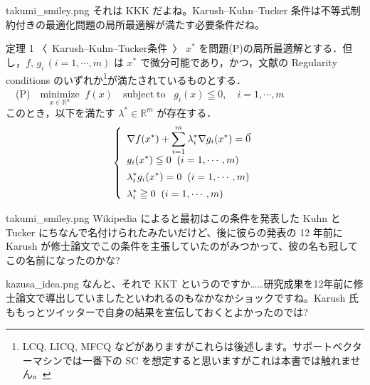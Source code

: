 \documentclass[b5paper,xelatex,ja=standard,10pt]{bxjsarticle}
\begin{document}
\begin{SERIFU}[colback=PaleGold, colbacktitle=PaleGold2]{takumi_smiley.png}
それは KKK だよね。Karush–Kuhn–Tucker 条件は不等式制約付きの最適化問題の局所最適解が満たす必要条件だね。
\end{SERIFU}

\begin{PROP}[colback=White]{定理 1 〈\, Karush–Kuhn–Tucker条件 \,〉}
$x^\ast$ を問題(P)の局所最適解とする．但し，$f, \, g_i \, (i = 1, \cdots, m)$ は $x^\ast$ で微分可能であり，かつ，文献\cite{wikipedia_en}の Regularity conditions のいずれか\footnote{LCQ, LICQ, MFCQ などがありますがこれらは後述します。サポートベクターマシンでは一番下の SC を想定すると思いますがこれは本書では触れません。}が満たされているものとする．
\\[5pt]
　(P)　$\displaystyle \underset{x \in \mathbb{R}^n}{\mathrm{minimize}} \; \; f(x)  \quad  \mathrm{subject \; to}   \; \; \; g_i(x) \leqq 0,  \quad i = 1, \cdots, m $
\\[5pt]
このとき，以下を満たす $\lambda^\ast \in \mathbb{R}^m$ が存在する．
\begin{eqnarray*}
\left\{
\begin{array}{l}
\displaystyle \nabla f (x^\ast) + \sum_{i=1}^m \lambda^\ast_i \nabla g_i (x^\ast) = \vec{0} \\[5pt]
\displaystyle g_i(x^\ast) \leqq 0 \; \; (i = 1, \cdots, m) \\[5pt]
\displaystyle \lambda^\ast_i g_i (x^\ast) = 0 \; \; (i = 1, \cdots, m) \\[5pt]
\displaystyle \lambda^\ast_i \geqq 0 \; \; (i = 1, \cdots, m) \notag
\end{array}
\right.
\end{eqnarray*}
\end{PROP}

\begin{SERIFU}[colback=PaleGold, colbacktitle=PaleGold2]{takumi_smiley.png}
Wikipedia \cite{wikipedia_en} によると最初はこの条件を発表した Kuhn と Tucker にちなんで名付けられたみたいだけど、後に彼らの発表の 12 年前に Karush が修士論文でこの条件を主張していたのがみつかって、彼の名も冠してこの名前になったのかな?
\end{SERIFU}

\begin{SERIFU}[colback=PaleIris, colbacktitle=PaleIris2]{kazusa_idea.png}
なんと、それで KKT というのですか……研究成果を12年前に修士論文で導出していましたといわれるのもなかなかショックですね。Karush 氏ももっとツイッターで自身の結果を宣伝しておくとよかったのでは?
\end{SERIFU}
\end{document}
